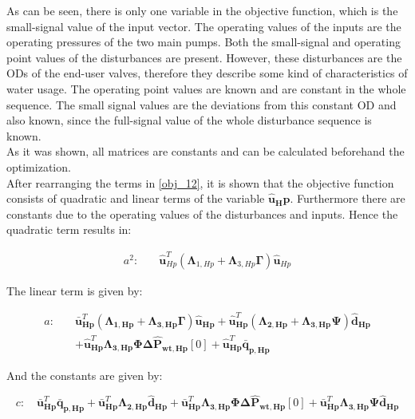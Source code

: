 As can be seen, there is only one variable in the objective function, which is the small-signal value of the input vector. The operating values of the inputs are the operating pressures of the two main pumps. Both the small-signal and operating point values of the disturbances are present. However, these disturbances are the ODs of the end-user valves, therefore they describe some kind of characteristics of water usage. The operating point values are known and are constant in the whole sequence. The small signal values are the deviations from this constant OD and also known, since the full-signal value of the whole disturbance sequence is known.
\\
As it was shown, all matrices are constants and can be calculated beforehand the optimization. 
\\
After rearranging the terms in \eqref{obj_12}, it is shown that the objective function consists of quadratic and linear terms of the variable $\bm{\hat{u}_Hp}$. Furthermore there are constants due to the operating values of the disturbances and inputs. Hence the quadratic term results in:

\begin{equation}
  \begin{split}
    a^2  : \quad & \bm{\hat{u}}_{Hp}^{T}(\bm{\Lambda}_{1,Hp} + \bm{\Lambda}_{3,Hp} \bm{\Gamma} ) \bm{\hat{u}}_{Hp}
  \end{split}
\end{equation}

The linear term is given by: 

\begin{equation}
  \begin{split}
    a  : \quad & \bm{\bar{u}}_{\bm{Hp}}^{T}(\bm{\Lambda}_{\bm{1,Hp}} + \bm{\Lambda}_{\bm{3,Hp}} \bm{\Gamma} ) \bm{\hat{u}}_{\bm{Hp}} + \bm{\hat{u}}_{\bm{Hp}}^{T}(\bm{\Lambda}_{\bm{2,Hp}} + \bm{\Lambda}_{\bm{3,Hp}} \bm{\Psi} ) \bm{\hat{d}}_{\bm{Hp}}
    \\
    & + \bm{\hat{u}}_{\bm{Hp}}^{T}\bm{\Lambda}_{\bm{3,Hp}} \bm{\Phi} \bm{\Delta \hat{P}_{\bm{wt,Hp}}}[0] + \bm{\hat{u}}_{\bm{Hp}}^{T} \bm{\bar{q}}_{\bm{p,Hp}}
  \end{split}
\end{equation}

And the constants are given by:

\begin{equation}
    c  : \quad \bm{\bar{u}}_{\bm{Hp}}^{T}\bm{\bar{q}}_{\bm{p,Hp}}  + \bm{\bar{u}}_{\bm{Hp}}^{T}\bm{\Lambda}_{\bm{2,Hp}}\bm{\hat{d}}_{\bm{Hp}} + \bm{\bar{u}}_{\bm{Hp}}^{T}\bm{\Lambda}_{\bm{3,Hp}}\bm{\Phi} \bm{\Delta \hat{P}_{\bm{wt,Hp}}}[0] + \bm{\bar{u}}_{\bm{Hp}}^{T}\bm{\Lambda}_{\bm{3,Hp}}\bm{\Psi}\bm{\hat{d}}_{\bm{Hp}}
\end{equation}

